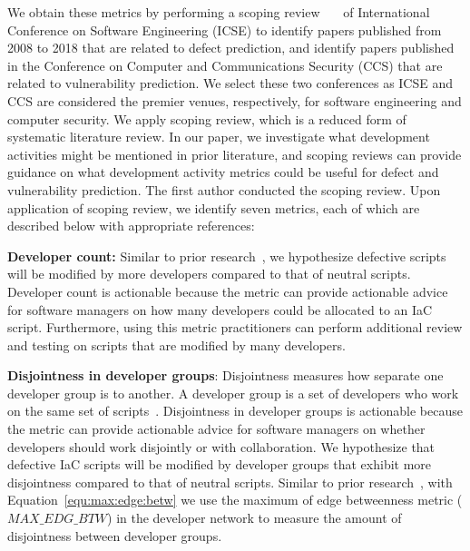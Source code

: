 \documentclass[smallextended]{svjour3}       %
\begin{document}
We obtain these metrics by performing a scoping review~\citep{munn2018:scoping}~\citep{scoping:original}~\citep{anderson2008:scoping} of International Conference on Software Engineering (ICSE) to identify papers published from 2008 to 2018 that are related to defect prediction, and identify papers published in the Conference on Computer and Communications Security (CCS) that are related to vulnerability prediction. We select these two conferences as ICSE and CCS are considered the premier venues, respectively, for software engineering and computer security. We apply scoping review, which is a reduced form of systematic literature review. In our paper, we investigate what development activities might be mentioned in prior literature, and scoping reviews can provide guidance on what development activity metrics could be useful for defect and vulnerability prediction. The first author conducted the scoping review. Upon application of scoping review, we identify seven metrics, each of which are described below with appropriate references:  


\textbf{Developer count:} Similar to prior research~\citep{Meneely:Linus}, we hypothesize defective scripts will be modified by more developers compared to that of neutral scripts. Developer count is actionable because the metric can provide actionable advice for software managers on how many developers could be allocated to an IaC script. Furthermore, using this metric practitioners can perform additional review and testing on scripts that are modified by many developers.    

\textbf{Disjointness in developer groups}: Disjointness measures how separate one developer group is to another. A developer group is a set of developers who work on the same set of scripts~\citep{Meneely:Linus}. Disjointness in developer groups is actionable because the metric can provide actionable advice for software managers on whether developers should work disjointly or with collaboration. We hypothesize that defective IaC scripts will be modified by developer groups that exhibit more disjointness compared to that of neutral scripts. Similar to prior research~\citep{Meneely:Linus}, with Equation~\ref{equ:max:edge:betw} we use the maximum of edge betweenness metric ($MAX\_EDG\_BTW$) in the developer network to measure the amount of disjointness between developer groups. 
\end{document}
